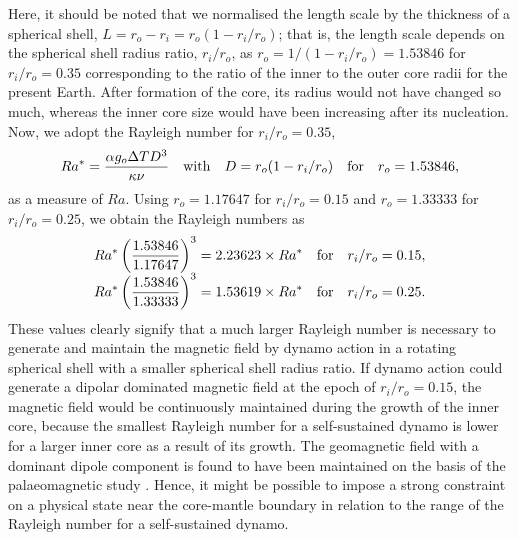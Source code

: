 Here, it should be noted that we normalised the length scale by the thickness of a spherical shell, $L = r_o - r_i = r_o (1 - r_i / r_o)$; that is, the length scale depends on the spherical shell radius ratio, $r_i / r_o$, as $r_o = 1 / (1 - r_i / r_o) = 1.53846$ for $r_i / r_o = 0.35$ corresponding to the ratio of the inner to the outer core radii for the present Earth.
After formation of the core, its radius would not have changed so much, whereas the inner core size would have been increasing after its nucleation.
Now, we adopt the Rayleigh number for $r_i / r_o = 0.35$,
%
\begin{equation}
    Ra^* = \frac{\alpha g_o \Delta T D^3}{\kappa\nu}
    ~~~{\rm with}~~~D = r_o (1 - r_i / r_o)
    ~~~{\rm for}~~~r_o = 1.53846,
\label{eq:Ra_0.35}
\end{equation}
%
as a measure of $Ra$.
Using $r_o = 1.17647$ for $r_i / r_o = 0.15$ and $r_o = 1.33333$ for $r_i / r_o = 0.25$, we obtain the Rayleigh numbers as
%
\begin{equation}
\begin{array}{l}
    \displaystyle
    Ra^* \left( \frac{1.53846}{1.17647} \right)^3
    = 2.23623 \times Ra^* 
    ~~~{\rm for} ~~~ r_i / r_o = 0.15,\\
    \displaystyle
    Ra^* \left( \frac{1.53846}{1.33333} \right)^3
    = 1.53619 \times Ra^* 
    ~~~{\rm for} ~~~ r_i / r_o = 0.25.
\end{array}
\end{equation}
%
These values clearly signify that a much larger Rayleigh number is necessary to generate and maintain the magnetic field by dynamo action in a rotating spherical shell with a smaller spherical shell radius ratio.
If dynamo action could generate a dipolar dominated magnetic field at the epoch of $r_i / r_o = 0.15$, the magnetic field would be continuously maintained during the growth of the inner core, because the smallest Rayleigh number for a self-sustained dynamo is lower for a larger inner core as a result of its growth.
The geomagnetic field with a dominant dipole component is found to have been maintained on the basis of the palaeomagnetic study \citep{Merrill:98}.
Hence, it might be possible to impose a strong constraint on a physical state near the core-mantle boundary in relation to the range of the Rayleigh number for a self-sustained dynamo.
%

